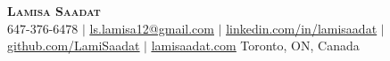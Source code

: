 \documentclass[letterpaper,11pt]{article}
\begin{document}

\begin{center}
    \textbf{\Huge \scshape Lamisa Saadat} \\ \vspace{4pt}
    \small 647-376-6478 $|$
    \href{mailto:ls.lamisa12@gmail.com}{\underline{ls.lamisa12@gmail.com}} $|$ 
    \href{http://www.linkedin.com/in/lamisaadat}{\underline{linkedin.com/in/lamisaadat}} $|$
    \href{https://github.com/LamiSaadat}{\underline{github.com/LamiSaadat}} $|$
    \href{http://www.lamisaadat.com}{\underline{lamisaadat.com}}
    \vspace{4pt} 
    \newline\small Toronto, ON, Canada 
\end{center}


\end{document}
